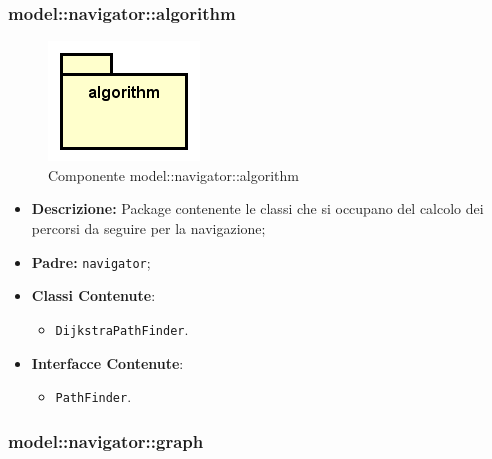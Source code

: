 \documentclass[../DefinizioneDiProdotto.tex]{subfiles}
\begin{document}
\subsubsection{model::\-navigator::\-algorithm}

\begin{figure}[H]
	\centering
	\includegraphics[width=\maxwidth]{img/package/algorithm.png}
	\caption{Componente model::\-navigator::\-algorithm}\label{fig:model::navigator::algorithm} 
\end{figure}
\begin{itemize}
	\item \textbf{Descrizione:} Package contenente le classi che si occupano del calcolo dei percorsi da seguire per la navigazione;
	\item \textbf{Padre:} \texttt{navigator};
	\item \textbf{Classi Contenute}:
	\begin{itemize}
		\item \texttt{DijkstraPathFinder}.
		
	\end{itemize}
	\item \textbf{Interfacce Contenute}:
	\begin{itemize}
		\item \texttt{PathFinder}.
		
	\end{itemize}
\end{itemize}

\subsubsection{model::\-navigator::\-graph}
\end{document}
